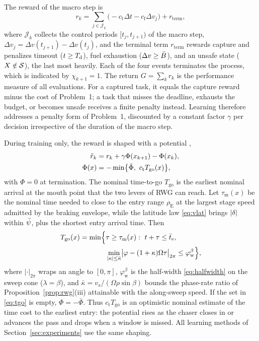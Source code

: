 The reward of the macro step is
\begin{equation}\label{eq:reward}
r_{k}=\sum_{j\in\mathcal{J}_{k}}\bigl(-c_{\mathrm{t}}\Delta t-c_{\mathrm{f}}\Delta v_{j}\bigr)+r_{\mathrm{term}},
\end{equation}
where $\mathcal{J}_{k}$ collects the control periods $[t_{j},t_{j+1})$ of the macro step, $\Delta v_{j}=\Delta v(t_{j+1})-\Delta v(t_{j})$, and the terminal term $r_{\mathrm{term}}$ rewards capture and penalizes timeout ($t\ge T_{\mathrm{d}}$), fuel exhaustion ($\Delta v\ge\bar B$), and an unsafe state ($X\notin\mathcal{S}$), the last most heavily. Each of the four events terminates the process, which is indicated by $\chi_{k+1}=1$. The return $G=\sum_{k}r_{k}$ is the performance measure of all evaluations. For a captured task, it equals the capture reward minus the cost of Problem~1; a task that misses the deadline, exhausts the budget, or becomes unsafe receives a finite penalty instead. Learning therefore addresses a penalty form of Problem~1, discounted by a constant factor $\gamma$ per decision irrespective of the duration of the macro step.

During training only, the reward is shaped with a potential \cite{ng1999shaping},
\begin{equation}\label{eq:shaping}
\begin{aligned}
\rtil_{k}&=r_{k}+\gamma\Phi(x_{k+1})-\Phi(x_{k}),\\
\Phi(x)&=-\min\bigl\{\bar\Phi,\ c_{\mathrm{t}}T_{\mathrm{go}}(x)\bigr\},
\end{aligned}
\end{equation}
with $\Phi=0$ at termination. The nominal time-to-go $T_{\mathrm{go}}$ is the earliest nominal arrival at the mouth point that the two levers of RWG can reach. Let $\tau_{\mathrm{m}}(x)$ be the nominal time needed to close to the entry range $\rho_{\mathrm{E}}$ at the largest stage speed admitted by the braking envelope, while the latitude law \eqref{eq:vlat} brings $|\delta|$ within $\bar\psi$, plus the shortest entry arrival time. Then
\begin{equation}\label{eq:tgo}
\begin{aligned}
T_{\mathrm{go}}(x)=\min\Bigl\{&\tau\ge\tau_{\mathrm{m}}(x):\ t+\tau\le\te,\\
&\min_{|\kappa|\le\bar\kappa}\bigl|\varphi-(1+\kappa)\Omega\tau\bigr|_{2\pi}\le\varphi_{\mathrm{w}}^{\beta}\Bigr\},
\end{aligned}
\end{equation}
where $|\cdot|_{2\pi}$ wraps an angle to $[0,\pi]$, $\varphi_{\mathrm{w}}^{\beta}$ is the half-width \eqref{eq:halfwidth} on the sweep cone ($\lambda=\beta$), and $\bar\kappa=v_{\mathrm{a}}/(\Omega\rho\sin\beta)$ bounds the phase-rate ratio of Proposition~\ref{prop:rwg}(iii) attainable with the along-sweep speed. If the set in \eqref{eq:tgo} is empty, $\Phi=-\bar\Phi$. Thus $c_{\mathrm{t}}T_{\mathrm{go}}$ is an optimistic nominal estimate of the time cost to the earliest entry: the potential rises as the chaser closes in or advances the pass and drops when a window is missed. All learning methods of Section~\ref{sec:experiments} use the same shaping.

